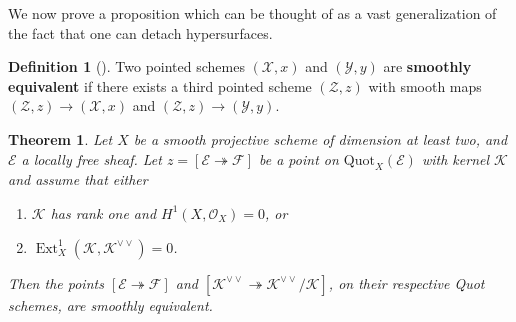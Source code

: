 \documentclass[leqno,11pt,a4paper]{amsart}
\newtheorem{thm}{Theorem}[section]
\theoremstyle{definition}
\newtheorem{definition}[definition]{Definition}
\numberwithin{equation}{section}
\newcommand{\Quot}{\mathrm{Quot}}
\newcommand{\EE}{\mathscr{E}}
\newcommand{\FF}{\mathscr{F}}
\newcommand{\OO}{\mathscr{O}}
\newcommand{\KK}{\mathscr{K}}
\newcommand{\XX}{\mathcal{X}}
\newcommand{\YY}{\mathcal{Y}}
\DeclareMathOperator{\Ext}{Ext}
\begin{document}
We now prove a proposition which can be thought of as a vast generalization of the fact that one can detach hypersurfaces. 

\begin{definition}[{\cite{Jelisiejew__Pathologies, Vakil_MurphyLaw}}] Two pointed schemes $(\XX,x)$ and $(\YY,y)$ are \textbf{smoothly equivalent} if there exists a third pointed scheme $(\mathcal{Z},z)$ with smooth maps $(\mathcal{Z},z) \to (\XX,x)$ and $(\mathcal{Z},z) \to (\YY,y)$.
\end{definition}



\begin{thm} \label{double_dual_prop}
Let $X$ be a smooth projective scheme of dimension at least two, and $\EE$ a locally free sheaf. Let $z = [\EE \twoheadrightarrow \FF]$ be a point on $\Quot_X(\EE)$ with kernel $\KK$ and assume that either
\begin{enumerate}
\item[(i)] $\KK$ has rank one and $H^1(X,\OO_X)=0$, or
\item[(ii)] $\Ext^1_X(\KK,\KK^{\vee\vee}) = 0$.
\end{enumerate}
Then the points $[\EE \twoheadrightarrow \FF]$ and $[\KK^{\vee\vee} \twoheadrightarrow \KK^{\vee\vee}/\KK]$, on their respective Quot schemes, are smoothly equivalent.
 \end{thm}
\end{document}
